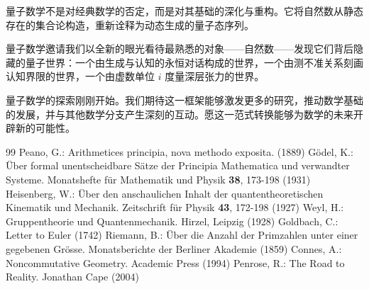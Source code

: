 \documentclass[12pt]{article}
\theoremstyle{definition}
\begin{document}
量子数学不是对经典数学的否定，而是对其基础的深化与重构。它将自然数从静态存在的集合论构造，重新诠释为动态生成的量子态序列。

量子数学邀请我们以全新的眼光看待最熟悉的对象——自然数——发现它们背后隐藏的量子世界：一个由生成与认知的永恒对话构成的世界，一个由测不准关系刻画认知界限的世界，一个由虚数单位 \(i\) 度量深层张力的世界。

量子数学的探索刚刚开始。我们期待这一框架能够激发更多的研究，推动数学基础的发展，并与其他数学分支产生深刻的互动。愿这一范式转换能够为数学的未来开辟新的可能性。


\begin{thebibliography}{99}
 Peano, G.: Arithmetices principia, nova methodo exposita. (1889)
 Gödel, K.: Über formal unentscheidbare Sätze der Principia Mathematica und verwandter Systeme. Monatshefte für Mathematik und Physik \textbf{38}, 173-198 (1931)
 Heisenberg, W.: Über den anschaulichen Inhalt der quantentheoretischen Kinematik und Mechanik. Zeitschrift für Physik \textbf{43}, 172-198 (1927)
 Weyl, H.: Gruppentheorie und Quantenmechanik. Hirzel, Leipzig (1928)
 Goldbach, C.: Letter to Euler (1742)
 Riemann, B.: Über die Anzahl der Primzahlen unter einer gegebenen Grösse. Monatsberichte der Berliner Akademie (1859)
 Connes, A.: Noncommutative Geometry. Academic Press (1994)
 Penrose, R.: The Road to Reality. Jonathan Cape (2004)
\end{thebibliography}
\end{document}
